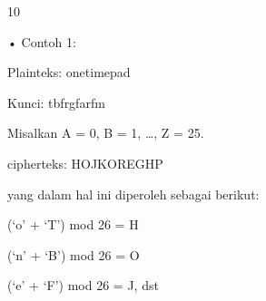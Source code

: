 \documentclass{article}
\begin{document}

10

• Contoh 1: 

 Plainteks: onetimepad

 Kunci:       tbfrgfarfm

 Misalkan A = 0, B = 1, …, Z = 25. 

 cipherteks: HOJKOREGHP

 yang dalam hal ini diperoleh sebagai berikut:


(‘o’ + ‘T’) mod 26 = H


(‘n’ + ‘B’) mod 26 = O


(‘e’ + ‘F’) mod 26 = J,  dst
\end{document}
